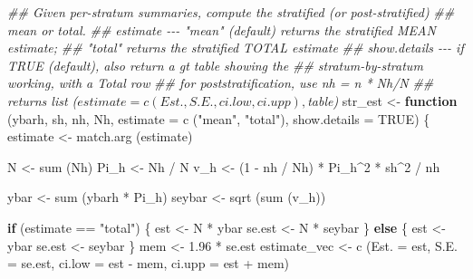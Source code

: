 \documentclass[
  letterpaper,
  DIV=11,
  numbers=noendperiod]{scrreprt}
\newenvironment{Shaded}{\begin{snugshade}}{\end{snugshade}}
\newcommand{\AttributeTok}[1]{\textcolor[rgb]{0.40,0.45,0.13}{#1}}
\newcommand{\ConstantTok}[1]{\textcolor[rgb]{0.56,0.35,0.01}{#1}}
\newcommand{\ControlFlowTok}[1]{\textcolor[rgb]{0.00,0.23,0.31}{\textbf{#1}}}
\newcommand{\DecValTok}[1]{\textcolor[rgb]{0.68,0.00,0.00}{#1}}
\newcommand{\DocumentationTok}[1]{\textcolor[rgb]{0.37,0.37,0.37}{\textit{#1}}}
\newcommand{\FloatTok}[1]{\textcolor[rgb]{0.68,0.00,0.00}{#1}}
\newcommand{\FunctionTok}[1]{\textcolor[rgb]{0.28,0.35,0.67}{#1}}
\newcommand{\NormalTok}[1]{\textcolor[rgb]{0.00,0.23,0.31}{#1}}
\newcommand{\OtherTok}[1]{\textcolor[rgb]{0.00,0.23,0.31}{#1}}
\newcommand{\SpecialCharTok}[1]{\textcolor[rgb]{0.37,0.37,0.37}{#1}}
\newcommand{\StringTok}[1]{\textcolor[rgb]{0.13,0.47,0.30}{#1}}
\renewcommand{\[}{\begin{equation}}
\renewcommand{\]}{\end{equation}}
\begin{document}
\begin{Shaded}
\begin{Highlighting}[]
\DocumentationTok{\#\# Given per{-}stratum summaries, compute the stratified (or post{-}stratified)}
\DocumentationTok{\#\# mean or total.}
\DocumentationTok{\#\# estimate {-}{-}{-} "mean" (default) returns the stratified MEAN estimate;}
\DocumentationTok{\#\#              "total" returns the stratified TOTAL estimate}
\DocumentationTok{\#\# show.details {-}{-}{-} if TRUE (default), also return a gt table showing the}
\DocumentationTok{\#\#                  stratum{-}by{-}stratum working, with a Total row}
\DocumentationTok{\#\# for poststratification, use nh = n * Nh/N}
\DocumentationTok{\#\# returns list ($estimate = c(Est., S.E., ci.low, ci.upp), $table)}
\NormalTok{str\_est }\OtherTok{\textless{}{-}} \ControlFlowTok{function}\NormalTok{ (ybarh, sh, nh, Nh, }\AttributeTok{estimate =} \FunctionTok{c}\NormalTok{ (}\StringTok{"mean"}\NormalTok{, }\StringTok{"total"}\NormalTok{), }\AttributeTok{show.details =} \ConstantTok{TRUE}\NormalTok{)}
\NormalTok{\{}
\NormalTok{    estimate }\OtherTok{\textless{}{-}} \FunctionTok{match.arg}\NormalTok{ (estimate)}

\NormalTok{    N    }\OtherTok{\textless{}{-}} \FunctionTok{sum}\NormalTok{ (Nh)}
\NormalTok{    Pi\_h }\OtherTok{\textless{}{-}}\NormalTok{ Nh }\SpecialCharTok{/}\NormalTok{ N}
\NormalTok{    v\_h  }\OtherTok{\textless{}{-}}\NormalTok{ (}\DecValTok{1} \SpecialCharTok{{-}}\NormalTok{ nh }\SpecialCharTok{/}\NormalTok{ Nh) }\SpecialCharTok{*}\NormalTok{ Pi\_h}\SpecialCharTok{\^{}}\DecValTok{2} \SpecialCharTok{*}\NormalTok{ sh}\SpecialCharTok{\^{}}\DecValTok{2} \SpecialCharTok{/}\NormalTok{ nh}

\NormalTok{    ybar   }\OtherTok{\textless{}{-}} \FunctionTok{sum}\NormalTok{ (ybarh }\SpecialCharTok{*}\NormalTok{ Pi\_h)}
\NormalTok{    seybar }\OtherTok{\textless{}{-}} \FunctionTok{sqrt}\NormalTok{ (}\FunctionTok{sum}\NormalTok{ (v\_h))}

    \ControlFlowTok{if}\NormalTok{ (estimate }\SpecialCharTok{==} \StringTok{"total"}\NormalTok{)}
\NormalTok{    \{}
\NormalTok{        est    }\OtherTok{\textless{}{-}}\NormalTok{ N }\SpecialCharTok{*}\NormalTok{ ybar}
\NormalTok{        se.est }\OtherTok{\textless{}{-}}\NormalTok{ N }\SpecialCharTok{*}\NormalTok{ seybar}
\NormalTok{    \}}
    \ControlFlowTok{else}
\NormalTok{    \{}
\NormalTok{        est    }\OtherTok{\textless{}{-}}\NormalTok{ ybar}
\NormalTok{        se.est }\OtherTok{\textless{}{-}}\NormalTok{ seybar}
\NormalTok{    \}}
\NormalTok{    mem          }\OtherTok{\textless{}{-}} \FloatTok{1.96} \SpecialCharTok{*}\NormalTok{ se.est}
\NormalTok{    estimate\_vec }\OtherTok{\textless{}{-}} \FunctionTok{c}\NormalTok{ (}\AttributeTok{Est. =}\NormalTok{ est, }\AttributeTok{S.E. =}\NormalTok{ se.est, }\AttributeTok{ci.low =}\NormalTok{ est }\SpecialCharTok{{-}}\NormalTok{ mem, }\AttributeTok{ci.upp =}\NormalTok{ est }\SpecialCharTok{+}\NormalTok{ mem)}


\end{Highlighting}
\end{Shaded}
\end{document}
